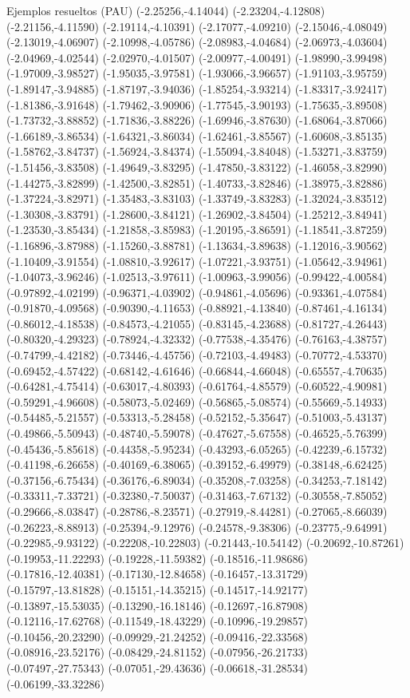 \documentclass[11pt,a4paper]{article}
\begin{document}
\begin{fmex}{Ejemplos resueltos (PAU)}
(-2.25256,-4.14044) (-2.23204,-4.12808) (-2.21156,-4.11590) (-2.19114,-4.10391) (-2.17077,-4.09210) (-2.15046,-4.08049) (-2.13019,-4.06907) (-2.10998,-4.05786) (-2.08983,-4.04684) (-2.06973,-4.03604) (-2.04969,-4.02544) (-2.02970,-4.01507) (-2.00977,-4.00491) (-1.98990,-3.99498) (-1.97009,-3.98527) (-1.95035,-3.97581) (-1.93066,-3.96657) (-1.91103,-3.95759) (-1.89147,-3.94885) (-1.87197,-3.94036) (-1.85254,-3.93214) (-1.83317,-3.92417) (-1.81386,-3.91648) (-1.79462,-3.90906) (-1.77545,-3.90193) (-1.75635,-3.89508) (-1.73732,-3.88852) (-1.71836,-3.88226) (-1.69946,-3.87630) (-1.68064,-3.87066) (-1.66189,-3.86534) (-1.64321,-3.86034) (-1.62461,-3.85567) (-1.60608,-3.85135) (-1.58762,-3.84737) (-1.56924,-3.84374) (-1.55094,-3.84048) (-1.53271,-3.83759) (-1.51456,-3.83508) (-1.49649,-3.83295) (-1.47850,-3.83122) (-1.46058,-3.82990) (-1.44275,-3.82899) (-1.42500,-3.82851) (-1.40733,-3.82846) (-1.38975,-3.82886) (-1.37224,-3.82971) (-1.35483,-3.83103) (-1.33749,-3.83283) (-1.32024,-3.83512) (-1.30308,-3.83791) (-1.28600,-3.84121) (-1.26902,-3.84504) (-1.25212,-3.84941) (-1.23530,-3.85434) (-1.21858,-3.85983) (-1.20195,-3.86591) (-1.18541,-3.87259) (-1.16896,-3.87988) (-1.15260,-3.88781) (-1.13634,-3.89638) (-1.12016,-3.90562) (-1.10409,-3.91554) (-1.08810,-3.92617) (-1.07221,-3.93751) (-1.05642,-3.94961) (-1.04073,-3.96246) (-1.02513,-3.97611) (-1.00963,-3.99056) (-0.99422,-4.00584) (-0.97892,-4.02199) (-0.96371,-4.03902) (-0.94861,-4.05696) (-0.93361,-4.07584) (-0.91870,-4.09568) (-0.90390,-4.11653) (-0.88921,-4.13840) (-0.87461,-4.16134) (-0.86012,-4.18538) (-0.84573,-4.21055) (-0.83145,-4.23688) (-0.81727,-4.26443) (-0.80320,-4.29323) (-0.78924,-4.32332) (-0.77538,-4.35476) (-0.76163,-4.38757) (-0.74799,-4.42182) (-0.73446,-4.45756) (-0.72103,-4.49483) (-0.70772,-4.53370) (-0.69452,-4.57422) (-0.68142,-4.61646) (-0.66844,-4.66048) (-0.65557,-4.70635) (-0.64281,-4.75414) (-0.63017,-4.80393) (-0.61764,-4.85579) (-0.60522,-4.90981) (-0.59291,-4.96608) (-0.58073,-5.02469) (-0.56865,-5.08574) (-0.55669,-5.14933) (-0.54485,-5.21557) (-0.53313,-5.28458) (-0.52152,-5.35647) (-0.51003,-5.43137) (-0.49866,-5.50943) (-0.48740,-5.59078) (-0.47627,-5.67558) (-0.46525,-5.76399) (-0.45436,-5.85618) (-0.44358,-5.95234) (-0.43293,-6.05265) (-0.42239,-6.15732) (-0.41198,-6.26658) (-0.40169,-6.38065) (-0.39152,-6.49979) (-0.38148,-6.62425) (-0.37156,-6.75434) (-0.36176,-6.89034) (-0.35208,-7.03258) (-0.34253,-7.18142) (-0.33311,-7.33721) (-0.32380,-7.50037) (-0.31463,-7.67132) (-0.30558,-7.85052) (-0.29666,-8.03847) (-0.28786,-8.23571) (-0.27919,-8.44281) (-0.27065,-8.66039) (-0.26223,-8.88913) (-0.25394,-9.12976) (-0.24578,-9.38306) (-0.23775,-9.64991) (-0.22985,-9.93122) (-0.22208,-10.22803) (-0.21443,-10.54142) (-0.20692,-10.87261) (-0.19953,-11.22293) (-0.19228,-11.59382) (-0.18516,-11.98686) (-0.17816,-12.40381) (-0.17130,-12.84658) (-0.16457,-13.31729) (-0.15797,-13.81828) (-0.15151,-14.35215) (-0.14517,-14.92177) (-0.13897,-15.53035) (-0.13290,-16.18146) (-0.12697,-16.87908) (-0.12116,-17.62768) (-0.11549,-18.43229) (-0.10996,-19.29857) (-0.10456,-20.23290) (-0.09929,-21.24252) (-0.09416,-22.33568) (-0.08916,-23.52176) (-0.08429,-24.81152) (-0.07956,-26.21733) (-0.07497,-27.75343) (-0.07051,-29.43636) (-0.06618,-31.28534) (-0.06199,-33.32286) 
\end{fmex}
\end{document}
